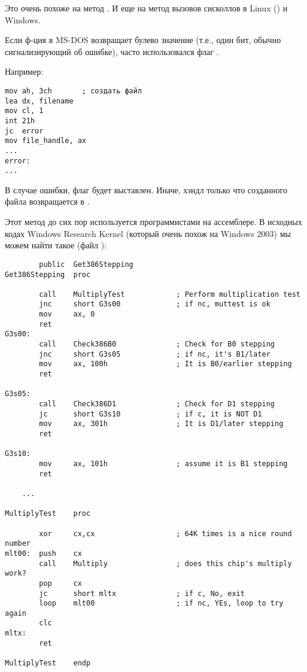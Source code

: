Это очень похоже на метод .
И еще на метод вызовов сисколлов в Linux () и Windows.

Если ф-ция в MS-DOS возвращает булево значение (т.е., один бит, обычно сигнализирующий об ошибке),
часто использовался флаг .

Например:

\begin{lstlisting}
mov ah, 3ch       ; создать файл
lea dx, filename
mov cl, 1
int 21h
jc  error
mov file_handle, ax
...
error:
...
\end{lstlisting}

В случае ошибки, флаг  будет выставлен.
Иначе, хэндл только что созданного файла возвращается в .

Этот метод до сих пор используется программистами на ассемблере.
В исходных кодах Windows Research Kernel (который очень похож на Windows 2003) мы можем найти такое
(файл ):

\begin{lstlisting}
        public  Get386Stepping
Get386Stepping  proc

        call    MultiplyTest            ; Perform multiplication test
        jnc     short G3s00             ; if nc, muttest is ok
        mov     ax, 0
        ret
G3s00:
        call    Check386B0              ; Check for B0 stepping
        jnc     short G3s05             ; if nc, it's B1/later
        mov     ax, 100h                ; It is B0/earlier stepping
        ret

G3s05:
        call    Check386D1              ; Check for D1 stepping
        jc      short G3s10             ; if c, it is NOT D1
        mov     ax, 301h                ; It is D1/later stepping
        ret

G3s10:
        mov     ax, 101h                ; assume it is B1 stepping
        ret

	...

MultiplyTest    proc

        xor     cx,cx                   ; 64K times is a nice round number
mlt00:  push    cx
        call    Multiply                ; does this chip's multiply work?
        pop     cx
        jc      short mltx              ; if c, No, exit
        loop    mlt00                   ; if nc, YEs, loop to try again
        clc
mltx:
        ret

MultiplyTest    endp
\end{lstlisting}


